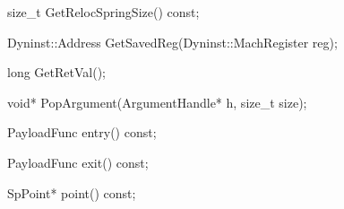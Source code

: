 \begin{apient}
size_t GetRelocSpringSize() const;
\end{apient}

\begin{apient}
Dyninst::Address GetSavedReg(Dyninst::MachRegister reg);
\end{apient}

\begin{apient}
long GetRetVal();
\end{apient}

\begin{apient}
void* PopArgument(ArgumentHandle* h, size_t size);
\end{apient}

\begin{apient}
PayloadFunc entry() const;
\end{apient}

\begin{apient}
PayloadFunc exit() const;
\end{apient}

\begin{apient}
SpPoint* point() const;
\end{apient}


